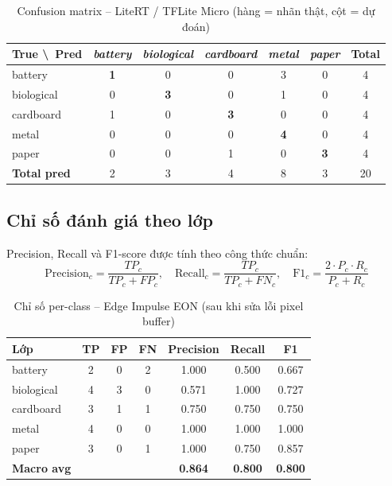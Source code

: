 \documentclass[12pt,a4paper]{article}
\begin{document}
\begin{table}[H]
\centering
\caption{Confusion matrix -- LiteRT / TFLite Micro (hàng = nhãn thật, cột = dự đoán)}
\begin{tabular}{@{}l|ccccc|c@{}}
\toprule
\textbf{True \textbackslash\ Pred} & \textit{battery} & \textit{biological} & \textit{cardboard} & \textit{metal} & \textit{paper} & \textbf{Total} \\
\midrule
battery     & \textbf{1} & 0 & 0 & 3 & 0 & 4 \\
biological  & 0 & \textbf{3} & 0 & 1 & 0 & 4 \\
cardboard   & 1 & 0 & \textbf{3} & 0 & 0 & 4 \\
metal       & 0 & 0 & 0 & \textbf{4} & 0 & 4 \\
paper       & 0 & 0 & 1 & 0 & \textbf{3} & 4 \\
\midrule
\textbf{Total pred} & 2 & 3 & 4 & 8 & 3 & 20 \\
\bottomrule
\end{tabular}
\end{table}

\subsection{Chỉ số đánh giá theo lớp}

Precision, Recall và F1-score được tính theo công thức chuẩn:
\[
  \text{Precision}_c = \frac{TP_c}{TP_c + FP_c}, \quad
  \text{Recall}_c    = \frac{TP_c}{TP_c + FN_c}, \quad
  \text{F1}_c        = \frac{2 \cdot P_c \cdot R_c}{P_c + R_c}
\]

\begin{table}[H]
\centering
\caption{Chỉ số per-class -- Edge Impulse EON (sau khi sửa lỗi pixel buffer)}
\begin{tabular}{@{}lcccccc@{}}
\toprule
\textbf{Lớp} & \textbf{TP} & \textbf{FP} & \textbf{FN} & \textbf{Precision} & \textbf{Recall} & \textbf{F1} \\
\midrule
battery    & 2 & 0 & 2 & 1.000 & 0.500 & 0.667 \\
biological & 4 & 3 & 0 & 0.571 & 1.000 & 0.727 \\
cardboard  & 3 & 1 & 1 & 0.750 & 0.750 & 0.750 \\
metal      & 4 & 0 & 0 & 1.000 & 1.000 & 1.000 \\
paper      & 3 & 0 & 1 & 1.000 & 0.750 & 0.857 \\
\midrule
\textbf{Macro avg} & & & & \textbf{0.864} & \textbf{0.800} & \textbf{0.800} \\
\bottomrule
\end{tabular}
\end{table}
\end{document}
